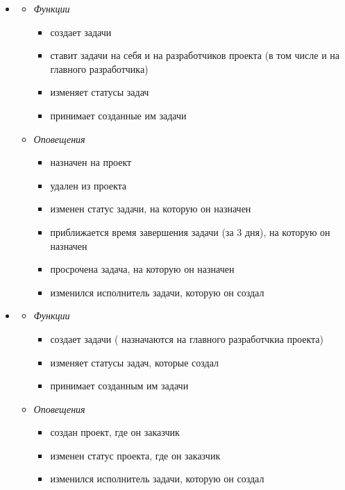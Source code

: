 \documentclass[14pt,a4paper]{extarticle}
\begin{document}
\begin{enumerate}
\begin{enumerate}
\begin{itemize}
				\item {}
				\begin{itemize}
					\item {\it Функции}
					\begin{itemize}
						\item создает задачи
						\item ставит задачи на себя и на разработчиков проекта (в том числе и на главного разработчика)
						\item изменяет статусы задач
						\item принимает созданные им задачи
					\end{itemize}
					
					\item {\it Оповещения}
					\begin{itemize}
						\item назначен на проект
						\item удален из проекта
						\item изменен статус задачи, на которую он назначен
						\item приближается время завершения задачи (за 3 дня), на которую он назначен
						\item просрочена задача, на которую он назначен
						\item изменился исполнитель задачи, которую он создал
					\end{itemize}
					
				\end{itemize}
				
				\item {}
				\begin{itemize}
					\item {\it Функции}
					\begin{itemize}
						\item создает задачи ({} назначаются на главного разработчкиа проекта)
						\item изменяет статусы задач, которые создал
						\item принимает созданным им задачи
					\end{itemize}
					
					\item {\it Оповещения}
					\begin{itemize}
						\item создан проект, где он заказчик
						\item изменен статус проекта, где он заказчик
						\item изменился исполнитель задачи, которую он создал
					\end{itemize}
					

\end{itemize}
\end{itemize}
\end{enumerate}
\end{enumerate}
\end{document}
